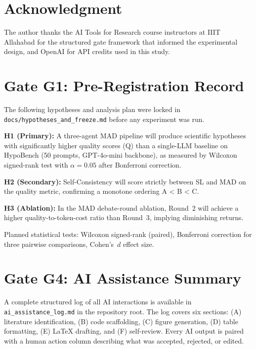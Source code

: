 \section*{Acknowledgment}

The author thanks the AI Tools for Research course instructors at IIIT Allahabad
for the structured gate framework that informed the experimental design, and
OpenAI for API credits used in this study.

\appendix
\section{Gate G1: Pre-Registration Record}
\label{app:g1}

The following hypotheses and analysis plan were locked in
\texttt{docs/hypotheses\_and\_freeze.md} before any experiment was run.

\textbf{H1 (Primary):} A three-agent MAD pipeline will produce scientific
hypotheses with significantly higher quality scores (Q) than a single-LLM
baseline on HypoBench (50 prompts, GPT-4o-mini backbone), as measured by
Wilcoxon signed-rank test with $\alpha = 0.05$ after Bonferroni correction.

\textbf{H2 (Secondary):} Self-Consistency will score strictly between SL and MAD
on the quality metric, confirming a monotone ordering A < B < C.

\textbf{H3 (Ablation):} In the MAD debate-round ablation, Round~2 will achieve a
higher quality-to-token-cost ratio than Round~3, implying diminishing returns.

Planned statistical tests: Wilcoxon signed-rank (paired), Bonferroni correction
for three pairwise comparisons, Cohen's~$d$ effect size.

\section{Gate G4: AI Assistance Summary}
\label{app:g4}

A complete structured log of all AI interactions is available in
\texttt{ai\_assistance\_log.md} in the repository root.  The log covers six
sections: (A) literature identification, (B) code scaffolding, (C) figure
generation, (D) table formatting, (E) LaTeX drafting, and (F) self-review.
Every AI output is paired with a human action column describing what was accepted,
rejected, or edited.
